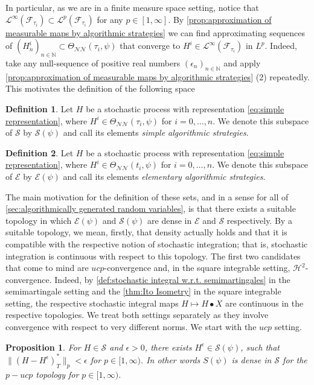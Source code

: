 \documentclass[11pt]{report}
\theoremstyle{plain} %
\newtheorem{proposition}[proposition]{Proposition}
\theoremstyle{definition} %
\newtheorem{definition}[definition]{Definition}
\theoremstyle{remark} %
\begin{document}
In particular, as we are in a finite measure space setting, notice that \(\mathcal{L}^{\infty}(\mathcal{F}_{\tau_i})\subset\mathcal{L}^{p}(\mathcal{F}_{\tau_i})\) for any \(p\in[1,\infty]\). By \cref{prop:approximation of measurable maps by algorithmic strategies} we can find approximating sequences of \((H^i_n)_{n\in\mathbb{N}}\subset\Theta_{\mathcal{NN}}(\tau_i,\psi)\) that converge to \(H^i\in\mathcal{L}^{\infty}(\mathcal{F}_{\tau_i})\) in \(L^p\). Indeed, take any null-sequence of positive real numbers \((\epsilon_n)_{n\in\mathbb{N}}\) and apply \cref{prop:approximation of measurable maps by algorithmic strategies} (2) repeatedly. This motivates the definition of the following space
\begin{definition}
    Let \(H\) be a stochastic process with representation \cref{eq:simple representation}, where \(H^i\in\Theta_{\mathcal{NN}}(\tau_i,\psi)\) for \(i=0,\dots,n\). We denote this subspace of \(\mathcal{S}\) by \(\mathcal{S}(\psi)\) and call its elements \textit{simple algorithmic strategies}.
\end{definition}
\begin{definition}
    Let \(H\) be a stochastic process with representation \cref{eq:simple representation}, where \(H^i\in\Theta_{\mathcal{NN}}(t_i,\psi)\) for \(i=0,\dots,n\). We denote this subspace of \(\mathcal{E}\) by \(\mathcal{E}(\psi)\) and call its elements \textit{elementary algorithmic strategies}.
\end{definition}
The main motivation for the definition of these sets, and in a sense for all of \cref{sec:algorithmically generated random variables}, is that there exists a suitable topology in which \(\mathcal{E}(\psi)\) and \(\mathcal{S}(\psi)\) are dense in \(\mathcal{E}\) and \(\mathcal{S}\) respectively. By a suitable topology, we mean, firstly, that density actually holds and that it is compatible with the respective notion of stochastic integration; that is, stochastic integration is continuous with respect to this topology. The first two candidates that come to mind are \(ucp\)-convergence and, in the square integrable setting, \(\mathcal{H}^2\)-convergence. Indeed, by \cref{def:stochastic integral w.r.t. semimartingales} in the semimartingale setting and the \cref{thm:Ito Isometry} in the square integrable setting, the respective stochastic integral maps \(H\mapsto H\bullet X\) are continuous in the respective topologies. We treat both settings separately as they involve convergence with respect to very different norms. We start with the \(ucp\) setting. 
\begin{proposition}\label{prop:p-ucp density of S}
    For \(H\in\mathcal{S}\) and \(\epsilon>0\), there exists \(H^{\epsilon}\in\mathcal{S}(\psi)\), such that \(\lVert(H-H^{\epsilon})_{T}^*\rVert_p<\epsilon\) for \(p\in[1,\infty)\). In other words \(S(\psi)\) is dense in \(\mathcal{S}\) for the \(p-ucp\) topology for \(p\in[1,\infty)\).
\end{proposition}
\end{document}

